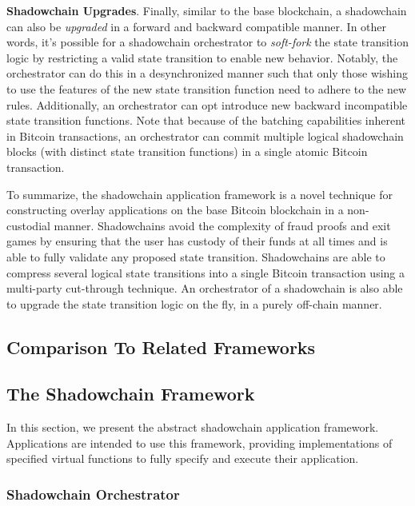 \documentclass[10pt,a4paper]{article}
\theoremstyle{definition}
\begin{document}
\textbf{Shadowchain Upgrades}. Finally, similar to the base blockchain, a
shadowchain can also be \emph{upgraded} in a forward and backward compatible
manner. In other words, it's possible for a shadowchain orchestrator to
\emph{soft-fork} the state transition logic by restricting a valid state
transition to enable new behavior. Notably, the orchestrator can do this in a
desynchronized manner such that only those wishing to use the features of the
new state transition function need to adhere to the new rules. Additionally, an
orchestrator can opt introduce new backward incompatible state transition
functions. Note that because of the batching capabilities inherent in Bitcoin
transactions, an orchestrator can commit multiple logical shadowchain blocks
(with distinct state transition functions) in a single atomic Bitcoin
transaction.

To summarize, the shadowchain application framework is a novel technique for
constructing overlay applications on the base Bitcoin blockchain in a
non-custodial manner. Shadowchains avoid the complexity of fraud proofs and
exit games by ensuring that the user has custody of their funds at all times
and is able to fully validate any proposed state transition. Shadowchains are
able to compress several logical state transitions into a single Bitcoin
transaction using a multi-party cut-through technique. An orchestrator of a
shadowchain is also able to upgrade the state transition logic on the fly, in a
purely off-chain manner.


\subsection{Comparison To Related Frameworks}


\subsection{The Shadowchain Framework}

In this section, we present the abstract shadowchain application framework.
Applications are intended to use this framework, providing implementations of
specified virtual functions to fully specify and execute their application.

\subsubsection{Shadowchain Orchestrator}
\end{document}
